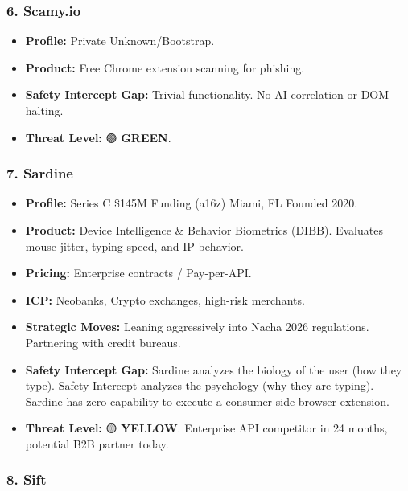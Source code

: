 \documentclass[
]{article}
\providecommand{\tightlist}{%
  \setlength{\itemsep}{0pt}\setlength{\parskip}{0pt}}
\begin{document}
\subsubsection{6. Scamy.io}\label{scamy.io}

\begin{itemize}
\tightlist
\item
  \textbf{Profile:} Private \textbar{} Unknown/Bootstrap.
\item
  \textbf{Product:} Free Chrome extension scanning for phishing.
\item
  \textbf{Safety Intercept Gap:} Trivial functionality. No AI
  correlation or DOM halting.
\item
  \textbf{Threat Level:} 🟢 \textbf{GREEN}.
\end{itemize}

\subsubsection{7. Sardine}\label{sardine}

\begin{itemize}
\tightlist
\item
  \textbf{Profile:} Series C \textbar{} \$145M Funding (a16z) \textbar{}
  Miami, FL \textbar{} Founded 2020.
\item
  \textbf{Product:} Device Intelligence \& Behavior Biometrics (DIBB).
  Evaluates mouse jitter, typing speed, and IP behavior.
\item
  \textbf{Pricing:} Enterprise contracts / Pay-per-API.
\item
  \textbf{ICP:} Neobanks, Crypto exchanges, high-risk merchants.
\item
  \textbf{Strategic Moves:} Leaning aggressively into Nacha 2026
  regulations. Partnering with credit bureaus.
\item
  \textbf{Safety Intercept Gap:} Sardine analyzes the biology of the
  user (how they type). Safety Intercept analyzes the psychology (why
  they are typing). Sardine has zero capability to execute a
  consumer-side browser extension.
\item
  \textbf{Threat Level:} 🟡 \textbf{YELLOW}. Enterprise API competitor
  in 24 months, potential B2B partner today.
\end{itemize}

\subsubsection{8. Sift}\label{sift}
\end{document}
